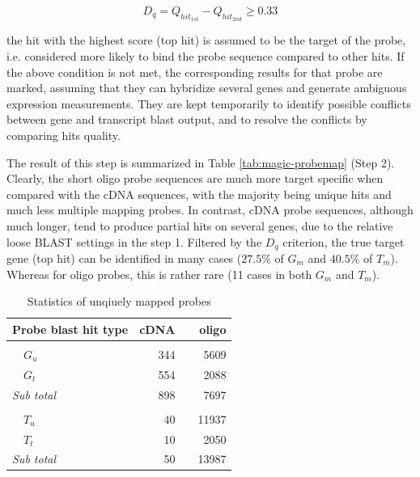\begin{equation}
D_q = Q_{hit_{1st}} - Q_{hit_{2nd}} \geq 0.33
\end{equation}

the hit with the highest score (top hit) is assumed to be the target of the probe, i.e. considered more likely to bind the probe sequence compared to other hits. If the above condition is not met, the corresponding results for that probe are marked, assuming that they can hybridize several genes and generate ambiguous expression measurements. They are kept temporarily to identify possible conflicts between gene and transcript blast output, and to resolve the conflicts by comparing hits quality. 

The result of this step is summarized in Table \ref{tab:magic-probemap} (Step 2). Clearly, the short oligo probe sequences are much more target specific when compared with the cDNA sequences, with the majority being unique hits and much less multiple mapping probes. In contrast, cDNA probe sequences, although much longer, tend to produce partial hits on several genes, due to the relative loose BLAST settings in the step 1. Filtered by the $D_q$ criterion, the true target gene (top hit) can be identified in many cases ($27.5\%$ of $G_m$ and $40.5\%$ of $T_m$). Whereas for oligo probes, this is rather rare (11 cases in both $G_m$ and $T_m$).


\begin{table}[tb]
	\centering
	\begin{threeparttable}
	\begin{footnotesize}
	\caption{Statistics of unqiuely mapped probes} 
	\label{tab:magic-uniquemaps}
	\begin{tabular}{@{}>{\centering\arraybackslash}p{5cm}rcr}
	\toprule
	 \textbf{Probe blast hit type} & \textbf{cDNA} & \phantom{a} & 
	 \textbf{oligo} \\
	\midrule
	
	\multicolumn{4}{l}{\textit{Gene blast}} \\
	~~$G_u$ & 344 && 5609 \\
	~~$G_t$ & 554 && 2088 \\
	\textit{Sub total} & 898 && 7697 \\[1.5ex]

	\multicolumn{4}{l}{\textit{Transcript blast}} \\
	~~$T_u$ & 40 && 11937 \\
	~~$T_t$ & 10 && 2050 \\
	\textit{Sub total} & 50 && 13987 \\

	\bottomrule
	\end{tabular}
	\end{footnotesize}
	\end{threeparttable}
\end{table}


